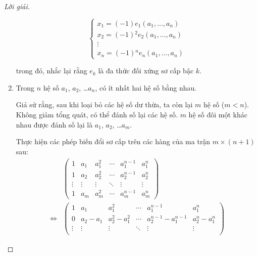 \documentclass[class=linearalgebra,crop=false]{standalone}
\begin{document}
\begin{proof}[Lời giải]
\begin{enumerate}[label = \textbf{Trường hợp \arabic*.},itemindent=2cm]
\[\begin{cases}
                      x_{1} = (-1)e_{1}(a_{1},\ldots,a_{n})       \\
                      x_{2} = (-1){}^{2}e_{2}(a_{1},\ldots,a_{n}) \\
                      \vdots                                      \\
                      x_{n} = (-1){}^{n}e_{n}(a_{1},\ldots,a_{n})
                  \end{cases}
              \]
              \par trong đó, nhắc lại rằng $e_{k}$ là đa thức đối xứng sơ cấp bậc $k$.
        \item Trong $n$ hệ số $a_{1}$, $a_{2}$, \ldots $a_{n}$, có ít nhất hai hệ số bằng nhau.
              \par Giả sử rằng, sau khi loại bỏ các hệ số dư thừa, ta còn lại $m$ hệ số ($m < n$). Không giảm tổng quát, có thể đánh số lại các hệ số. $m$ hệ số đôi một khác nhau được đánh số lại là $a_{1}$, $a_{2}$, \ldots $a_{m}$.
              \par Thực hiện các phép biến đổi sơ cấp trên các hàng của ma trận $m\times(n+1)$ sau:
              \begingroup
              \allowdisplaybreaks
              \begin{align*}
                                      &
                  \begin{pmatrix}
                      1      & a_{1}  & a_{1}^{2} & \cdots & a_{1}^{n-1} & a_{1}^{n} \\
                      1      & a_{2}  & a_{2}^{2} & \cdots & a_{2}^{n-1} & a_{2}^{n} \\
                      \vdots & \vdots & \vdots    & \ddots & \vdots      & \vdots    \\
                      1      & a_{m}  & a_{m}^{2} & \cdots & a_{m}^{n-1} & a_{m}^{n}
                  \end{pmatrix}                                                                                                                         \\
                  \Longleftrightarrow &
                  \begin{pmatrix}
                      1      & a_{1}         & a_{1}^{2}             & \cdots & a_{1}^{n-1}               & a_{1}^{n}             \\
                      0      & a_{2} - a_{1} & a_{2}^{2} - a_{1}^{2} & \cdots & a_{2}^{n-1} - a_{1}^{n-1} & a_{2}^{n} - a_{1}^{n} \\
                      \vdots & \vdots        & \vdots                & \ddots & \vdots                    & \vdots                \\

\end{pmatrix}
\end{align*}
\end{enumerate}
\end{proof}
\end{document}
